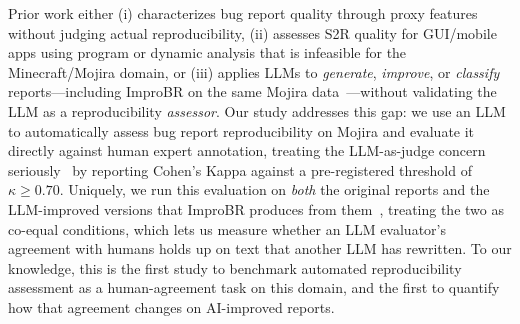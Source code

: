 Prior work either (i) characterizes bug report quality through proxy features
without judging actual reproducibility, (ii) assesses S2R quality for GUI/mobile
apps using program or dynamic analysis that is infeasible for the
Minecraft/Mojira domain, or (iii) applies LLMs to \emph{generate}, \emph{improve},
or \emph{classify} reports---including ImproBR on the same Mojira
data~\cite{akyol2026improbr}---without validating the LLM as a reproducibility
\emph{assessor}. Our study addresses this gap: we use an LLM to automatically
assess bug report reproducibility on Mojira and evaluate it directly against
human expert annotation, treating the LLM-as-judge concern
seriously~\cite{li2024judges} by reporting Cohen's Kappa against a pre-registered
threshold of $\kappa \geq 0.70$. Uniquely, we run this evaluation on \emph{both}
the original reports and the LLM-improved versions that ImproBR produces from
them~\cite{akyol2026improbr}, treating the two as co-equal conditions, which lets
us measure whether an LLM evaluator's agreement with humans holds up on text that
another LLM has rewritten. To our knowledge, this is the first study to benchmark
automated reproducibility assessment as a human-agreement task on this domain,
and the first to quantify how that agreement changes on AI-improved reports.
